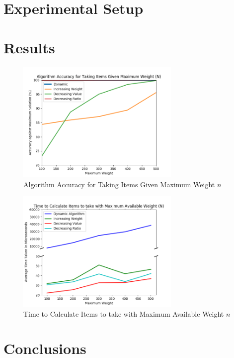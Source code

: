 \documentclass[10pt, letterpaper]{article}
\begin{document}
\section{Experimental Setup}


\section{Results}
	\begin{figure}[htbp]
		\begin{center}
			\includegraphics[width=0.70\textwidth]{python/accuracyGraph.png}
			\caption{Algorithm Accuracy for Taking Items Given Maximum Weight $n$}
			\label{fig:accuracy-graph}
		\end{center}
	\end{figure}
	\begin{figure}[htbp]
		\begin{center}
			\includegraphics[width=0.70\textwidth]{python/timeGraph.png}
			\caption{Time to Calculate Items to take with Maximum Available Weight $n$}
			\label{fig:time-graph}
		\end{center}
	\end{figure}

\section{Conclusions}
\end{document}
